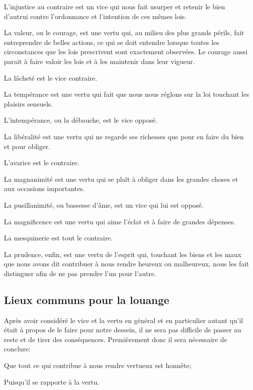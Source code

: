 L'injustice au contraire est un vice qui nous fait usurper et retenir le bien d'autrui contre l'ordonnance et
l'intention de ces mêmes lois.

La valeur, ou le courage, est une vertu qui, au milieu des plus grands périls, fait entreprendre de belles
actions, ce qui se doit entendre lorsque toutes les circonstances que les lois prescrivent sont exactement
observées. Le courage aussi parait à faire valoir les lois et à les maintenir dans leur vigueur.

La lâcheté est le vice contraire.

La tempérance est une vertu qui fait que nous nous réglons sur la loi touchant les plaisirs sensuels. 

L'intempérance, ou la débauche, est le vice opposé.

La libéralité est une vertu qui ne regarde ses richesses que pour en faire du bien et pour obliger. 

L'avarice est le contraire. 

La magnanimité est une vertu qui se plaît à obliger dans les grandes choses et aux occasions importantes.

La pusillanimité, ou bassesse d'âme, est un vice qui lui est opposé.

La magnificence est une vertu qui aime l'éclat et à faire de grandes dépenses.

La mesquinerie est tout le contraire.

La prudence, enfin, est une vertu de l'esprit qui, touchant les biens et les maux que nous avons dit
contribuer à nous rendre heureux ou malheureux, nous les fait distinguer afin de ne pas prendre l'un pour l'autre.

\subsection{Lieux communs pour la louange}

Après avoir considéré le vice et la vertu en général et en particulier autant qu'il était à propos de le faire pour
notre dessein, il ne sera pas difficile de passer au reste et de tirer des conséquences. Premièrement donc il sera
nécessaire de conclure:

\begin{lieu}
	Que tout ce qui contribue à nous rendre vertueux est honnête;
\end{lieu}

Puisqu'il se rapporte à la vertu.

\bigbreak

